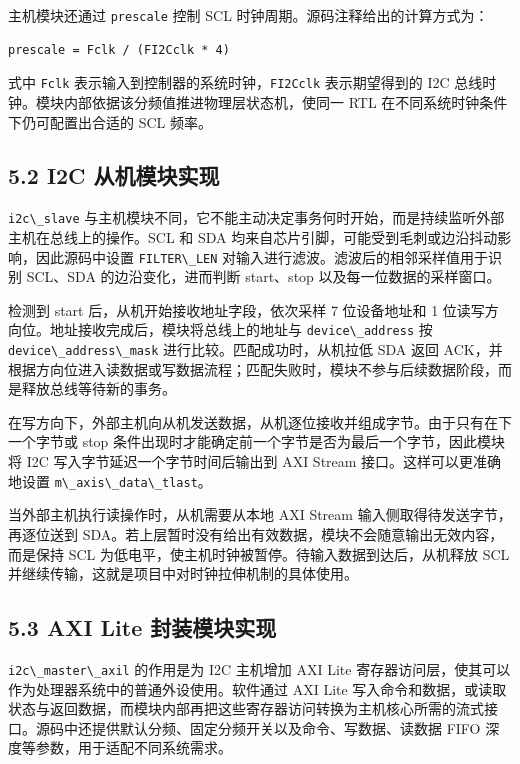 主机模块还通过 \passthrough{\lstinline!prescale!} 控制 SCL
时钟周期。源码注释给出的计算方式为：

\begin{lstlisting}
prescale = Fclk / (FI2Cclk * 4)
\end{lstlisting}

式中 \passthrough{\lstinline!Fclk!}
表示输入到控制器的系统时钟，\passthrough{\lstinline!FI2Cclk!}
表示期望得到的 I2C
总线时钟。模块内部依据该分频值推进物理层状态机，使同一 RTL
在不同系统时钟条件下仍可配置出合适的 SCL 频率。

\subsection{5.2 I2C
从机模块实现}\label{i2c-ux4eceux673aux6a21ux5757ux5b9eux73b0}

\passthrough{\lstinline!i2c\_slave!}
与主机模块不同，它不能主动决定事务何时开始，而是持续监听外部主机在总线上的操作。SCL
和 SDA 均来自芯片引脚，可能受到毛刺或边沿抖动影响，因此源码中设置
\passthrough{\lstinline!FILTER\_LEN!}
对输入进行滤波。滤波后的相邻采样值用于识别 SCL、SDA 的边沿变化，进而判断
start、stop 以及每一位数据的采样窗口。

检测到 start 后，从机开始接收地址字段，依次采样 7 位设备地址和 1
位读写方向位。地址接收完成后，模块将总线上的地址与
\passthrough{\lstinline!device\_address!} 按
\passthrough{\lstinline!device\_address\_mask!}
进行比较。匹配成功时，从机拉低 SDA 返回
ACK，并根据方向位进入读数据或写数据流程；匹配失败时，模块不参与后续数据阶段，而是释放总线等待新的事务。

在写方向下，外部主机向从机发送数据，从机逐位接收并组成字节。由于只有在下一个字节或
stop 条件出现时才能确定前一个字节是否为最后一个字节，因此模块将 I2C
写入字节延迟一个字节时间后输出到 AXI Stream 接口。这样可以更准确地设置
\passthrough{\lstinline!m\_axis\_data\_tlast!}。

当外部主机执行读操作时，从机需要从本地 AXI Stream
输入侧取得待发送字节，再逐位送到
SDA。若上层暂时没有给出有效数据，模块不会随意输出无效内容，而是保持 SCL
为低电平，使主机时钟被暂停。待输入数据到达后，从机释放 SCL
并继续传输，这就是项目中对时钟拉伸机制的具体使用。

\subsection{5.3 AXI Lite
封装模块实现}\label{axi-lite-ux5c01ux88c5ux6a21ux5757ux5b9eux73b0}

\passthrough{\lstinline!i2c\_master\_axil!} 的作用是为 I2C 主机增加 AXI
Lite 寄存器访问层，使其可以作为处理器系统中的普通外设使用。软件通过 AXI
Lite
写入命令和数据，或读取状态与返回数据，而模块内部再把这些寄存器访问转换为主机核心所需的流式接口。源码中还提供默认分频、固定分频开关以及命令、写数据、读数据
FIFO 深度等参数，用于适配不同系统需求。

